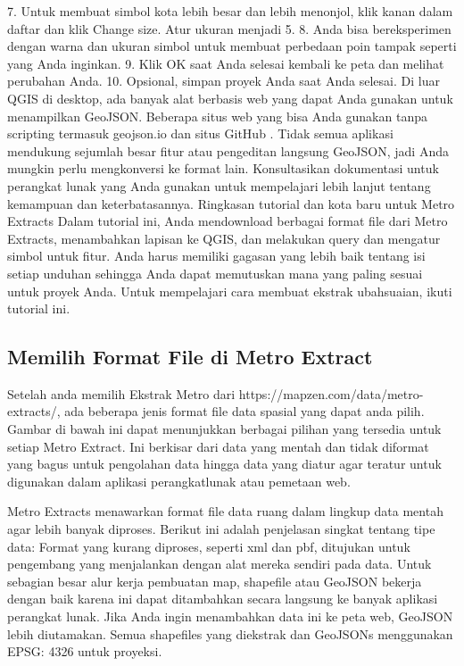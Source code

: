 7.	Untuk membuat simbol kota lebih besar dan lebih menonjol, klik kanan dalam daftar dan klik Change size. Atur ukuran menjadi 5.
8.	Anda bisa bereksperimen dengan warna dan ukuran simbol untuk membuat perbedaan poin tampak seperti yang Anda inginkan.
9.	Klik OK saat Anda selesai kembali ke peta dan melihat perubahan Anda.
10.	Opsional, simpan proyek Anda saat Anda selesai.
Di luar QGIS di desktop, ada banyak alat berbasis web yang dapat Anda gunakan untuk menampilkan GeoJSON. Beberapa situs web yang bisa Anda gunakan tanpa scripting termasuk geojson.io dan situs GitHub . Tidak semua aplikasi mendukung sejumlah besar fitur atau pengeditan langsung GeoJSON, jadi Anda mungkin perlu mengkonversi ke format lain. Konsultasikan dokumentasi untuk perangkat lunak yang Anda gunakan untuk mempelajari lebih lanjut tentang kemampuan dan keterbatasannya.
Ringkasan tutorial dan kota baru untuk Metro Extracts
Dalam tutorial ini, Anda mendownload berbagai format file dari Metro Extracts, menambahkan lapisan ke QGIS, dan melakukan query dan mengatur simbol untuk fitur. Anda harus memiliki gagasan yang lebih baik tentang isi setiap unduhan sehingga Anda dapat memutuskan mana yang paling sesuai untuk proyek Anda. Untuk mempelajari cara membuat ekstrak ubahsuaian, ikuti tutorial ini.

\subsection{Memilih Format File di Metro Extract}
Setelah anda memilih Ekstrak Metro dari https://mapzen.com/data/metro-extracts/, ada beberapa jenis format file data spasial yang dapat
anda pilih. Gambar di bawah ini dapat menunjukkan berbagai pilihan yang tersedia untuk setiap Metro Extract. Ini berkisar dari data yang
mentah dan tidak diformat yang bagus untuk pengolahan data hingga data yang diatur agar teratur untuk digunakan dalam aplikasi perangkatlunak atau pemetaan web.

Metro Extracts menawarkan format file data ruang dalam lingkup data mentah agar lebih banyak diproses. 
Berikut ini adalah penjelasan singkat tentang tipe data: Format yang kurang diproses, seperti xml dan pbf, ditujukan untuk pengembang yang menjalankan dengan alat mereka sendiri pada data. 
Untuk sebagian besar alur kerja pembuatan map, shapefile atau GeoJSON bekerja dengan baik karena ini dapat ditambahkan secara langsung ke banyak aplikasi perangkat lunak. 
Jika Anda ingin menambahkan data ini ke peta web, GeoJSON lebih diutamakan. Semua shapefiles yang diekstrak dan GeoJSONs menggunakan EPSG: 4326 untuk proyeksi.


